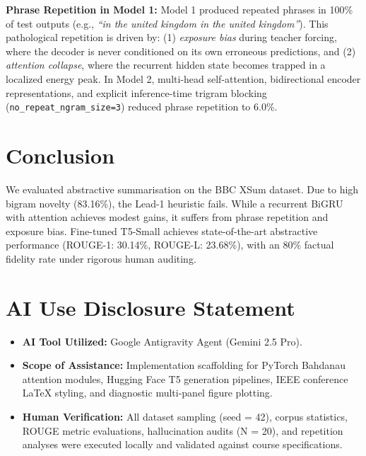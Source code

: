 \documentclass[conference]{IEEEtran}
\begin{document}
\textbf{Phrase Repetition in Model 1:} Model 1 produced repeated phrases in 100\% of test outputs (e.g., \textit{``in the united kingdom in the united kingdom''}). This pathological repetition is driven by: (1) \textit{exposure bias} during teacher forcing, where the decoder is never conditioned on its own erroneous predictions, and (2) \textit{attention collapse}, where the recurrent hidden state becomes trapped in a localized energy peak. In Model 2, multi-head self-attention, bidirectional encoder representations, and explicit inference-time trigram blocking (\texttt{no\_repeat\_ngram\_size=3}) reduced phrase repetition to 6.0\%.

\section{Conclusion}
We evaluated abstractive summarisation on the BBC XSum dataset. Due to high bigram novelty (83.16\%), the Lead-1 heuristic fails. While a recurrent BiGRU with attention achieves modest gains, it suffers from phrase repetition and exposure bias. Fine-tuned T5-Small achieves state-of-the-art abstractive performance (ROUGE-1: 30.14\%, ROUGE-L: 23.68\%), with an 80\% factual fidelity rate under rigorous human auditing.

\newpage
\section*{AI Use Disclosure Statement}
\begin{itemize}
\item \textbf{AI Tool Utilized:} Google Antigravity Agent (Gemini 2.5 Pro).
\item \textbf{Scope of Assistance:} Implementation scaffolding for PyTorch Bahdanau attention modules, Hugging Face T5 generation pipelines, IEEE conference LaTeX styling, and diagnostic multi-panel figure plotting.
\item \textbf{Human Verification:} All dataset sampling (seed = 42), corpus statistics, ROUGE metric evaluations, hallucination audits (N = 20), and repetition analyses were executed locally and validated against course specifications.
\end{itemize}
\end{document}
